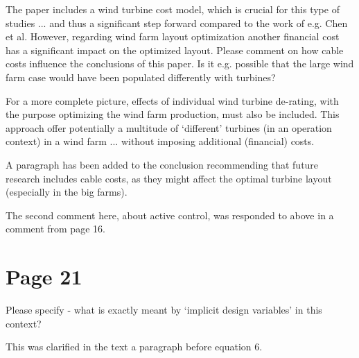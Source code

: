 \documentclass[12pt]{report}
\begin{document}
   \bigskip \color{black}
   The paper includes a wind turbine cost model, which is crucial for this type of studies ... and thus a significant step forward compared to the work of e.g. Chen et al.
 However, regarding wind farm layout optimization another financial cost has a significant impact on the optimized layout. Please comment on how cable costs influence the conclusions of this paper. Is it e.g. possible that the large wind farm case would have been populated differently with turbines?
   
For a more complete picture, effects of individual wind turbine de-rating, with the purpose optimizing the wind farm production, must also be included. This approach offer potentially a multitude of `different' turbines (in an operation context) in a wind farm ... without imposing additional (financial) costs.
   
      \color{blue} A paragraph has been added to the conclusion recommending that future research includes cable costs, as they might affect the optimal turbine layout (especially in the big farms). 
      
      The second comment here, about active control, was responded to above in a comment from page 16.
   
   \bigskip \color{black}
     \section*{Page 21}
     \bigskip \color{black}
   Please specify - what is exactly meant by `implicit design variables' in this context?
   
   \color{blue} This was clarified in the text a paragraph before equation 6.
\end{document}

